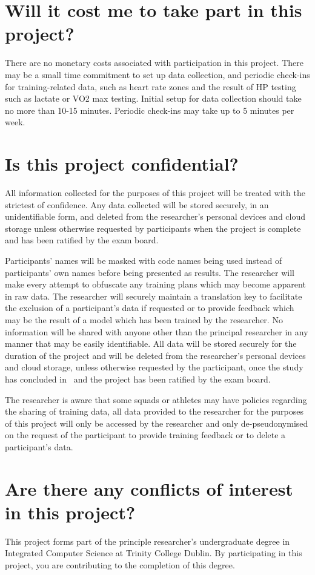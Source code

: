 \section*{Will it cost me to take part in this project?}
There are no monetary costs associated with participation in this project. There may be a small time commitment to set up data collection, and periodic check-ins for training-related data, such as heart rate zones and the result of HP testing such as lactate or VO2 max testing. Initial setup for data collection should take no more than 10-15 minutes. Periodic check-ins may take up to 5 minutes per week.
\section*{Is this project confidential?}
All information collected for the purposes of this project will be treated with the strictest of confidence. Any data collected will be stored securely, in an unidentifiable form, and deleted from the researcher's personal devices and cloud storage unless otherwise requested by participants when the project is complete and has been ratified by the exam board.

Participants' names will be masked with code names being used instead of participants' own names before being presented as results. The researcher will make every attempt to obfuscate any training plans which may become apparent in raw data. The researcher will securely maintain a translation key to facilitate the exclusion of a participant's data if requested or to provide feedback which may be the result of a model which has been trained by the researcher. No information will be shared with anyone other than the principal researcher in any manner that may be easily identifiable. All data will be stored securely for the duration of the project and will be deleted from the researcher's personal devices and cloud storage, unless otherwise requested by the participant, once the study has concluded in \deadline~and the project has been ratified by the exam board.

The researcher is aware that some squads or athletes may have policies regarding the sharing of training data, all data provided to the researcher for the purposes of this project will only be accessed by the researcher and only de-pseudonymised on the request of the participant to provide training feedback or to delete a participant's data.
\section*{Are there any conflicts of interest in this project?}
This project forms part of the principle researcher's undergraduate degree in Integrated Computer Science at Trinity College Dublin. By participating in this project, you are contributing to the completion of this degree.
